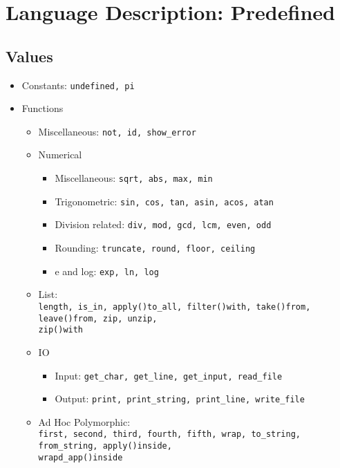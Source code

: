\documentclass{article}
\begin{document}
\section{Language Description: Predefined}

\subsection{Values}

\begin{itemize}

\item Constants: \texttt{undefined, pi}

\item Functions
  \begin{itemize}

  \item Miscellaneous: \texttt{not, id, show_error}

  \item Numerical
    \begin{itemize}
    \item Miscellaneous: \texttt{sqrt, abs, max, min}
    \item Trigonometric: \texttt{sin, cos, tan, asin, acos, atan}
    \item Division related: \texttt{div, mod, gcd, lcm, even, odd}
    \item Rounding: \texttt{truncate, round, floor, ceiling}
    \item e and log: \texttt{exp, ln, log}
    \end{itemize}

  \item List:\\
    \texttt{length, is_in, apply()to_all, filter()with, take()from, leave()from,
    zip, unzip,\\ zip()with}

  \item IO
    \begin{itemize}
    \item Input: \texttt{get_char, get_line, get_input, read_file}
    \item Output: \texttt{print, print_string, print_line, write_file}
    \end{itemize}

  \item Ad Hoc Polymorphic:\\
  \texttt{first, second, third, fourth, fifth, wrap, to_string, from_string,
  apply()inside, \\wrapd_app()inside}

  \end{itemize}
\end{itemize}
\end{document}
